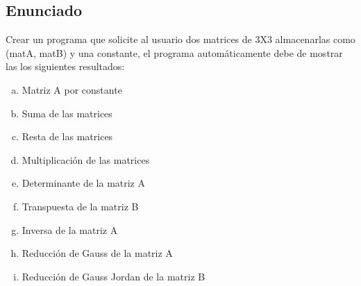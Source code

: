 \subsection{Enunciado}
Crear un programa que solicite al usuario dos matrices de 3X3 almacenarlas como (matA, matB) y
una constante, el programa automáticamente debe de mostrar las los siguientes resultados:
\begin{multicols}{2}
	\begin{enumerate}[a)]
		\item Matriz A por constante
		\item Suma de las matrices
		\item Resta de las matrices
		\item Multiplicación de las matrices
		\item Determinante de la matriz A
		\item Transpuesta de la matriz B
		\item Inversa de la matriz A
		\item Reducción de Gauss de la matriz A
		\item Reducción de Gauss Jordan de la matriz B
	\end{enumerate}
\end{multicols}


